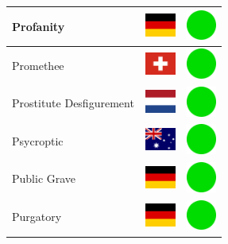 \documentclass[12pt, a4paper, twoside]{report}
\begin{document}
\begin{center}
\begin{longtable}{|p{5cm}|p{2cm}|p{2cm}|}
 Profanity                                                  & \includegraphics[width=1cm]{../4x3/de} &   \includegraphics[width=1cm]{../likes/y} \\ \hline
 Promethee                                                  & \includegraphics[width=1cm]{../4x3/ch} &   \includegraphics[width=1cm]{../likes/y} \\ \hline
 Prostitute Desfigurement                                   & \includegraphics[width=1cm]{../4x3/nl} &   \includegraphics[width=1cm]{../likes/y} \\ \hline
 Psycroptic                                                 & \includegraphics[width=1cm]{../4x3/au} &   \includegraphics[width=1cm]{../likes/y} \\ \hline
 Public Grave                                               & \includegraphics[width=1cm]{../4x3/de} &   \includegraphics[width=1cm]{../likes/y} \\ \hline
 Purgatory                                                  & \includegraphics[width=1cm]{../4x3/de} &   \includegraphics[width=1cm]{../likes/y} \\ \hline

\end{longtable}
\end{center}
\end{document}
